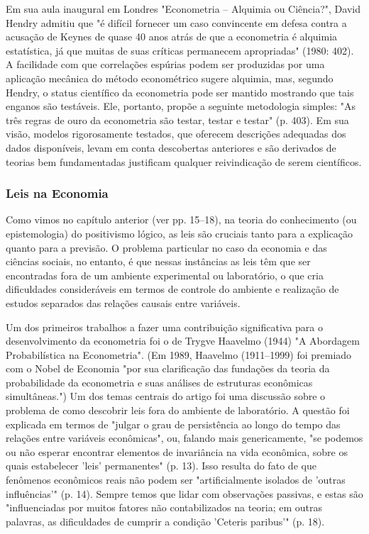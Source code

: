 \documentclass[12pt]{article}
\begin{document}
Em sua aula inaugural em Londres "Econometria – Alquimia ou Ciência?",
David Hendry admitiu que "é difícil fornecer um caso convincente
em defesa contra a acusação de Keynes de quase 40 anos atrás de que
a econometria é alquimia estatística, já que muitas de suas críticas permanecem
apropriadas" (1980: 402). A facilidade com que correlações espúrias podem ser
produzidas por uma aplicação mecânica do método econométrico sugere
alquimia, mas, segundo Hendry, o status científico da econometria
pode ser mantido mostrando que tais enganos são testáveis. Ele, portanto,
propõe a seguinte metodologia simples: "As três regras de ouro
da econometria são testar, testar e testar" (p. 403). Em sua visão, modelos rigorosamente
testados, que oferecem descrições adequadas dos dados disponíveis, levam
em conta descobertas anteriores e são derivados de teorias bem fundamentadas
justificam qualquer reivindicação de serem científicos.

\subsubsection{\textbf{Leis na Economia}}
Como vimos no capítulo anterior (ver pp. 15–18), na teoria do conhecimento (ou epistemologia) do positivismo lógico, as leis são cruciais tanto para a explicação quanto para a previsão. O problema particular no caso da economia e das ciências sociais, no entanto, é que nessas instâncias as leis têm que ser encontradas fora de um ambiente experimental ou laboratório, o que cria dificuldades consideráveis em termos de controle do ambiente e realização de estudos separados das relações causais entre variáveis.

Um dos primeiros trabalhos a fazer uma contribuição significativa para o desenvolvimento da econometria foi o de Trygve Haavelmo (1944) "A Abordagem Probabilística na Econometria". (Em 1989, Haavelmo (1911–1999) foi premiado com o Nobel de Economia "por sua clarificação das fundações da teoria da probabilidade da econometria e suas análises de estruturas econômicas simultâneas.") Um dos temas centrais do artigo foi uma discussão sobre o problema de como descobrir leis fora do ambiente de laboratório. A questão foi explicada em termos de "julgar o grau de persistência ao longo do tempo das relações entre variáveis econômicas", ou, falando mais genericamente, "se podemos ou não esperar encontrar elementos de invariância na vida econômica, sobre os quais estabelecer 'leis' permanentes" (p. 13). Isso resulta do fato de que fenômenos econômicos reais não podem ser "artificialmente isolados de 'outras influências'" (p. 14). Sempre temos que lidar com observações passivas, e estas são "influenciadas por muitos fatores não contabilizados na teoria; em outras palavras, as dificuldades de cumprir a condição 'Ceteris paribus'" (p. 18).
\end{document}
